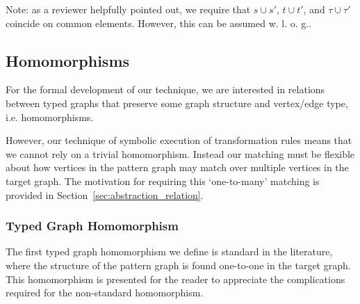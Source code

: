 Note: as a reviewer helpfully pointed out, we require that $s \cup s'$, $t \cup t'$, and $\tau \cup \tau'$ coincide on common elements. However, this can be assumed w. l. o. g..



\subsection{Homomorphisms}
\label{subsec:homomorphisms}

For the formal development of our technique, we are interested in relations between typed graphs that preserve some graph structure and vertex/edge type, i.e. homomorphisms.

However, our technique of symbolic execution of transformation rules means that we cannot rely on a trivial homomorphism. Instead our matching must be flexible about how vertices in the pattern graph may match over multiple vertices in the target graph. The motivation for requiring this `one-to-many' matching is provided in Section~\ref{sec:abstraction_relation}.

\subsubsection*{Typed Graph Homomorphism}

The first typed graph homomorphism we define is standard in the literature, where the structure of the pattern graph is found one-to-one in the target graph. This homomorphism is presented for the reader to appreciate the complications required for the non-standard homomorphism.

